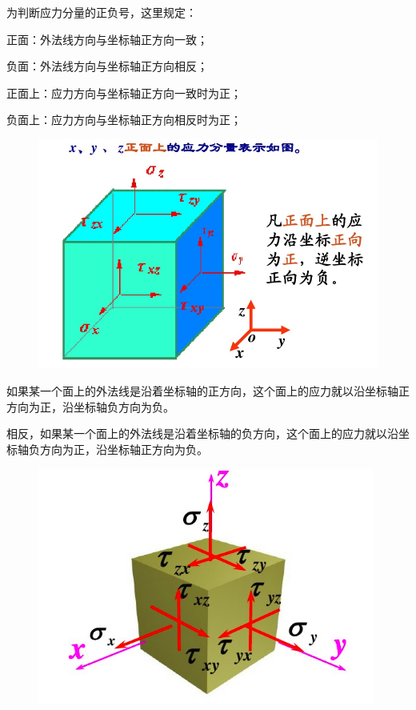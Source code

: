 \documentclass[12pt,a4paper]{article}
\begin{document}
为判断应力分量的正负号，这里规定：

正面：外法线方向与坐标轴正方向一致；

负面：外法线方向与坐标轴正方向相反；

正面上：应力方向与坐标轴正方向一致时为正；

负面上：应力方向与坐标轴正方向相反时为正；

\begin{figure}[H]
\centering
\includegraphics[scale=0.5]{./figures/18.png}
\caption{}
\end{figure}

如果某一个面上的外法线是沿着坐标轴的正方向，这个面上的应力就以沿坐标轴正方向为正，沿坐标轴负方向为负。

相反，如果某一个面上的外法线是沿着坐标轴的负方向，这个面上的应力就以沿坐标轴负方向为正，沿坐标轴正方向为负。

\begin{figure}[H]
\centering
\includegraphics[scale=0.5]{./figures/6.png}
\caption{}
\end{figure}
\end{document}
